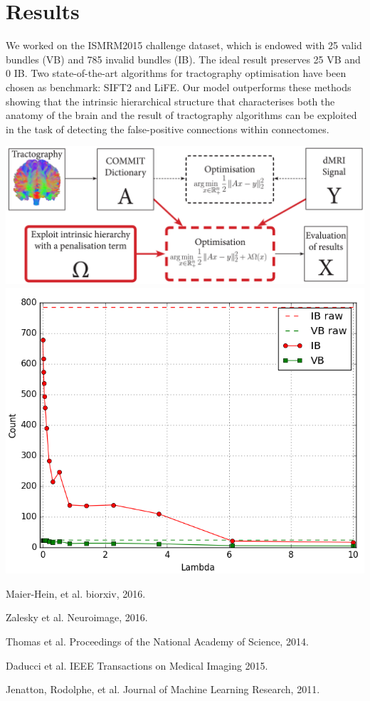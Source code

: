 \documentclass[10pt, a4paper]{article}
\begin{document}
\section{Results}We worked on the ISMRM2015 challenge dataset, which is endowed with 25 valid bundles (VB) and 785 invalid bundles (IB). The ideal result preserves 25 VB and 0 IB. Two state-of-the-art algorithms for tractography optimisation have been chosen as benchmark: SIFT2 and LiFE. Our model outperforms these methods showing that the intrinsic hierarchical structure that characterises both the anatomy of the brain and the result of tractography algorithms can be exploited in the task of detecting the false-positive connections within connectomes.

\begin{center}
\includegraphics[width=.5\textwidth]{diagram}
\qquad
\includegraphics[width=.24\textwidth]{results}
\end{center}




\begin{thebibliography}{}
Maier-Hein, et al.
 biorxiv, 2016.

Zalesky et al.
 Neuroimage, 2016.

Thomas et al.
 Proceedings of the National Academy of Science, 2014.

Daducci et al.
 IEEE Transactions on Medical Imaging 2015.

Jenatton, Rodolphe, et al.
 Journal of Machine Learning Research, 2011.

\end{thebibliography}
\end{document}
